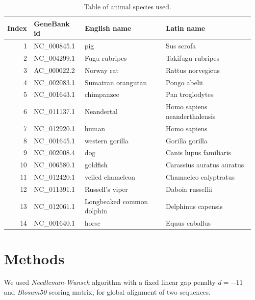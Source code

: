 \documentclass[a4paper,11pt]{article}
\begin{document}
\begin{table}[htbp]
\caption{Table of animal species used.}
\label{animalTable}
\begin{center}
\begin{tabular}{rllp{6cm}}
\hline
Index & GeneBank id & English name & Latin name\\
\hline
  1 &   NC\_000845.1 &                        pig &                     Sus scrofa \\
  2 &   NC\_004299.1 &              Fugu rubripes &              Takifugu rubripes \\ 
  3 &   AC\_000022.2 &                 Norway rat &              Rattus norvegicus \\
  4 &   NC\_002083.1 &         Sumatran orangutan &                   Pongo abelii \\
  5 &   NC\_001643.1 &                 chimpanzee &                Pan troglodytes \\
  6 &   NC\_011137.1 &                 Neandertal &  Homo sapiens neanderthalensis \\
  7 &   NC\_012920.1 &                      human &                   Homo sapiens \\
  8 &   NC\_001645.1 &            western gorilla &                Gorilla gorilla \\
  9 &   NC\_002008.4 &                        dog &         Canis lupus familiaris \\
 10 &   NC\_006580.1 &                   goldfish &      Carassius auratus auratus \\
 11 &   NC\_012420.1 &           veiled chameleon &          Chamaeleo calyptratus \\
 12 &   NC\_011391.1 &            Russell's viper &               Daboia russellii \\
 13 &   NC\_012061.1 &  Longbeaked common dolphin &             Delphinus capensis \\
 14 &   NC\_001640.1 &                      horse &                 Equus caballus 

\\
\hline
\end{tabular}
\end{center}
\end{table}


\section{Methods}

We used \textit{Needleman-Wunsch} algorithm with a fixed linear gap penalty $d=-11$ and \textit{Blosum50} scoring matrix, for global alignment of two sequences.\\
\end{document}
